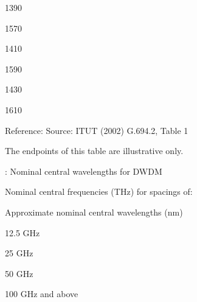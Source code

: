 \documentclass[letterpaper,10pt,english]{sphinxmanual}
\begin{document}
1390





1570









1410





1590









1430





1610







Reference: Source: ITU\sphinxhyphen{}T (2002) G.694.2, Table 1



 The end\sphinxhyphen{}points of this table are illustrative only.





: Nominal central wavelengths for DWDM









Nominal central frequencies (THz) for spacings of:





Approximate nominal central wavelengths (nm)









12.5 GHz





25 GHz





50 GHz





100 GHz and above
\end{document}

